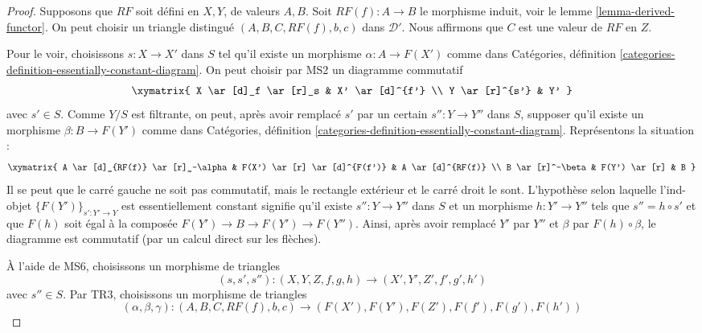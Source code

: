 \begin{proof}
Supposons que $RF$ soit défini en $X, Y$, de valeurs $A, B$. Soit
$RF(f) : A \to B$ le morphisme induit, voir le
lemme \ref{lemma-derived-functor}. On peut choisir un triangle distingué
$(A, B, C, RF(f), b, c)$ dans $\mathcal{D}'$. Nous affirmons que $C$ est une
valeur de $RF$ en $Z$.

\medskip\noindent
Pour le voir, choisissons $s : X \to X'$ dans $S$ tel qu'il existe un
morphisme $\alpha : A \to F(X')$ comme dans Catégories, définition
\ref{categories-definition-essentially-constant-diagram}. On peut choisir par
MS2 un diagramme commutatif
$$
\xymatrix{
X \ar[d]_f \ar[r]_s & X' \ar[d]^{f'} \\
Y \ar[r]^{s'} & Y'
}
$$
avec $s' \in S$. Comme $Y/S$ est filtrante, on peut, après avoir remplacé
$s'$ par un certain $s'' : Y \to Y''$ dans $S$, supposer qu'il existe un
morphisme $\beta : B \to F(Y')$ comme dans Catégories, définition
\ref{categories-definition-essentially-constant-diagram}. Représentons la
situation :
$$
\xymatrix{
A \ar[d]_{RF(f)} \ar[r]_-\alpha &
F(X') \ar[r] \ar[d]^{F(f')} &
A \ar[d]^{RF(f)} \\
B \ar[r]^-\beta & F(Y') \ar[r] & B
}
$$
Il se peut que le carré gauche ne soit pas commutatif, mais le rectangle
extérieur et le carré droit le sont. L'hypothèse selon laquelle l'ind-objet
$\{F(Y')\}_{s' : Y' \to Y}$ est essentiellement constant signifie qu'il
existe $s'' : Y \to Y''$ dans $S$ et un morphisme $h : Y' \to Y''$ tels que
$s'' = h \circ s'$ et que $F(h)$ soit égal à la composée
$F(Y') \to B \to F(Y') \to F(Y'')$. Ainsi, après avoir remplacé $Y'$ par
$Y''$ et $\beta$ par $F(h) \circ \beta$, le diagramme est commutatif (par un
calcul direct sur les flèches).

\medskip\noindent
À l'aide de MS6, choisissons un morphisme de triangles
$$
(s, s', s'') : (X, Y, Z, f, g, h) \longrightarrow
(X', Y', Z', f', g', h')
$$
avec $s'' \in S$. Par TR3, choisissons un morphisme de triangles
$$
(\alpha, \beta, \gamma) :
(A, B, C, RF(f), b, c)
\longrightarrow
(F(X'), F(Y'), F(Z'), F(f'), F(g'), F(h'))
$$


\end{proof}
